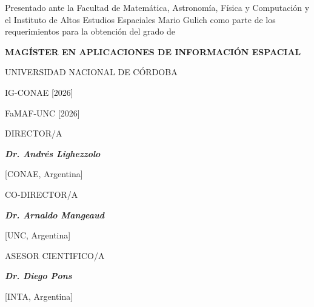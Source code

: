 \begin{center}
{\normalsize Presentado ante la Facultad de Matemática, Astronomía, Física y Computación y el Instituto de Altos Estudios Espaciales Mario Gulich como parte de los requerimientos para la obtención del grado de\par}

\vspace*{0.55cm}

{\textbf{MAGÍSTER EN APLICACIONES DE INFORMACIÓN ESPACIAL}\par}

\vspace*{0.45cm}

{\normalsize UNIVERSIDAD NACIONAL DE CÓRDOBA\par}

\vspace*{0.25cm}



\vspace*{0.35cm}

{\normalsize \textcopyright IG-CONAE [2026]\par}
{\normalsize \textcopyright FaMAF-UNC [2026]\par}

\vspace*{0.55cm}

{\normalsize DIRECTOR/A\par}
{\normalsize\textit{\textbf{Dr. Andrés Lighezzolo}}\par}
{\small [CONAE, Argentina]\par}

\vspace*{0.35cm}

{\normalsize CO-DIRECTOR/A\par}
{\normalsize\textit{\textbf{Dr. Arnaldo Mangeaud}}\par}
{\small [UNC, Argentina]\par}

\vspace*{0.35cm}

{\normalsize ASESOR CIENTIFICO/A\par}
{\normalsize\textit{\textbf{Dr. Diego Pons}}\par}
{\small [INTA, Argentina]\par}

\end{center}
\clearpage
\endgroup
